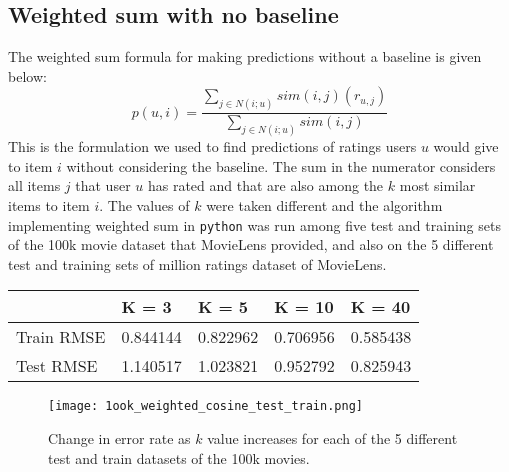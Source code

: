\documentclass[a4paper]{article}
\begin{document}
\subsection{Weighted sum with no baseline}
The weighted sum formula for making predictions without a baseline is given below:
$$p(u, i) = \frac{\sum_{j \in N(i;u)}sim(i,j)(r_{u,j})}{\sum_{j \in N(i;u)}sim(i, j)}$$
This is the formulation we used to find predictions of ratings users $u$ would give to item $i$ without considering the baseline. The sum in the numerator considers all items $j$ that user $u$ has rated and that are also among the $k$ most similar items to item $i$. The values of $k$ were taken different and the algorithm implementing weighted sum in \verb|python| was run among five test and training sets of the 100k movie dataset that MovieLens provided, and also on the 5 different test and training sets of million ratings dataset of MovieLens. 
\begin{center}
    \begin{tabular}{| l | l | l | l | l|}
    \hline
    & K = 3 & K = 5 & K = 10 & K = 40  \\ \hline
    Train RMSE &  0.844144 & 0.822962 & 0.706956 & 0.585438  \\ \hline
    Test RMSE & 1.140517 & 1.023821 & 0.952792 & 0.825943  \\ \hline
    \hline
    \end{tabular}
\end{center}

\begin{figure}
\centering
\texttt{[image: 1ook\_weighted\_cosine\_test\_train.png]}
\caption{\label{fig:weightedcos}Change in error rate as $k$ value increases for each of the 5 different test and train datasets of the 100k movies.}
\end{figure}
\end{document}
